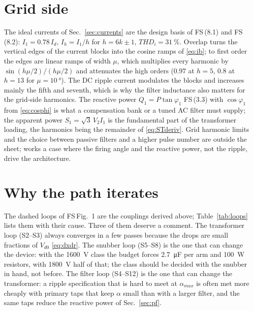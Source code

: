 \documentclass[10pt,a4paper]{scrartcl}
\newcommand{\Vdo}{V_{d0}}
\newcommand{\Id}{I_{d}}
\newcommand{\Vll}{V_{2}}
\newcommand{\fs}[1]{\textsf{FS}\,(#1)}
\newcommand{\fsfig}[1]{\textsf{FS}\,Fig.~#1}
\begin{document}
\section{Grid side}\label{sec:gridh}
The ideal currents of Sec.~\ref{sec:currents} are the design basis of \fs{8.1} and \fs{8.2}: $I_1 = 0.78\,\Id$, $I_h = I_1/h$ for $h = 6k\pm1$, $THD_i = \SI{31}{\percent}$. Overlap turns the vertical edges of the current blocks into the cosine ramps of \eqref{eq:ib}; to first order the edges are linear ramps of width $\mu$, which multiplies every harmonic by $\sin(h\mu/2)/(h\mu/2)$ and attenuates the high orders ($0.97$ at $h = 5$, $0.8$ at $h = 13$ for $\mu = \SI{10}{\degree}$). The DC ripple current modulates the blocks and increases mainly the fifth and seventh, which is why the filter inductance also matters for the grid-side harmonics. The reactive power $Q_1 = P\tan\varphi_1$ \fs{3.3} with $\cos\varphi_1$ from \eqref{eq:cosphi} is what a compensation bank or a tuned AC filter must supply; the apparent power $S_1 = \sqrt3\,\Vll I_1$ is the fundamental part of the transformer loading, the harmonics being the remainder of \eqref{eq:STderiv}. Grid harmonic limits and the choice between passive filters and a higher pulse number are outside the sheet; \cite{bagnara_acdc} works a case where the firing angle and the reactive power, not the ripple, drive the architecture.
\section{Why the path iterates}\label{sec:loops}
The dashed loops of \fsfig{1} are the couplings derived above; Table~\ref{tab:loops} lists them with their cause. Three of them deserve a comment. The transformer loop (S2--S3) always converges in a few passes because the drops are small fractions of $\Vdo$ \eqref{eq:dxdr}. The snubber loop (S5--S8) is the one that can change the device: with the \SI{1600}{V} class the budget forces \SI{2.7}{\micro F} per arm and \SI{100}{W} resistors, with \SI{1800}{V} half of that; the class should be decided with the snubber in hand, not before. The filter loop (S4--S12) is the one that can change the transformer: a ripple specification that is hard to meet at $\alpha_{max}$ is often met more cheaply with primary taps that keep $\alpha$ small than with a larger filter, and the same taps reduce the reactive power of Sec.~\ref{sec:pf}.
\end{document}
